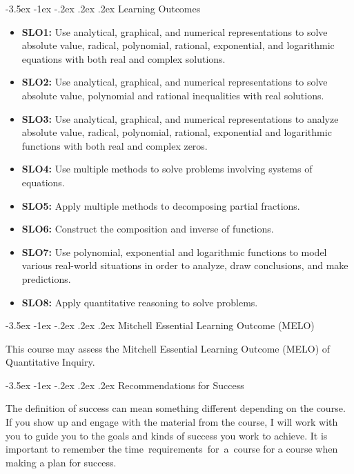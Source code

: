 \documentclass[11pt]{article}
\makeatletter
\renewcommand\section{\@startsection{section}{1}{0pt}%
  {-3.5ex \@plus -1ex \@minus -.2ex}%
  {.2ex \@plus.2ex}%
  {\normalfont\Large\bfseries}} %
\makeatother
\begin{document}
\section{Learning Outcomes}

\begin{itemize}
\item \textbf{SLO1:} Use analytical, graphical, and numerical representations to solve absolute value, radical, polynomial, rational, exponential, and logarithmic equations with both real and complex solutions.
\item \textbf{SLO2:} Use analytical, graphical, and numerical representations to solve absolute value, polynomial and rational inequalities with real solutions.
\item \textbf{SLO3:} Use analytical, graphical, and numerical representations to analyze absolute value, radical, polynomial, rational, exponential and logarithmic functions with both real and complex zeros.
\item \textbf{SLO4:} Use multiple methods to solve problems involving systems of equations.
\item \textbf{SLO5:} Apply multiple methods to decomposing partial fractions.
\item \textbf{SLO6:} Construct the composition and inverse of functions.
\item \textbf{SLO7:} Use polynomial, exponential and logarithmic functions to model various real-world situations in order to analyze, draw conclusions, and make predictions.
\item \textbf{SLO8:} Apply quantitative reasoning to solve problems.
\end{itemize}

\section{Mitchell Essential Learning Outcome (MELO)}

This course may assess the Mitchell Essential Learning Outcome (MELO) of Quantitative Inquiry.

\section{Recommendations for Success}

The definition of success can mean something different depending on the course. If you show up and engage with the material from the course, I will work with you to guide you to the goals and kinds of success you work to achieve. It is important to remember the time~requirements~for~a~course for a course when making a plan for success.
\end{document}
